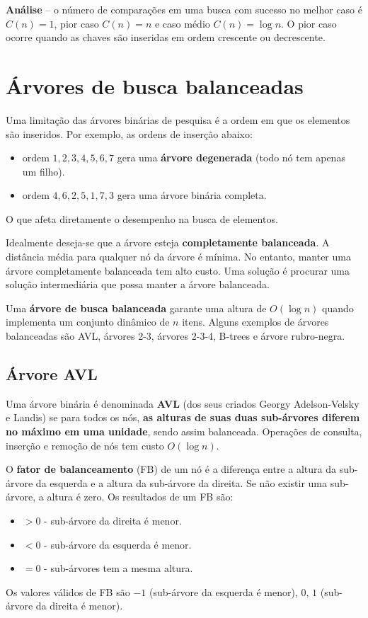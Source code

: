 {\bf Análise} -- o número de comparações em uma busca com sucesso no melhor caso é 
$C(n)= 1$, pior caso $C(n) = n$ e caso médio $C(n) = \log  n$.
O pior caso ocorre quando as chaves são inseridas em ordem crescente ou decrescente.

\section{Árvores de busca balanceadas}

Uma limitação das árvores binárias de pesquisa é a ordem em que os elementos
são inseridos. Por exemplo, as ordens de inserção abaixo:
\begin{itemize}
\item ordem $1, 2, 3, 4, 5, 6, 7$ gera uma {\bf árvore degenerada} (todo nó
tem apenas um filho).
\item ordem $4, 6, 2, 5, 1, 7, 3$ gera uma árvore binária completa.
\end{itemize}
O que afeta diretamente o desempenho na busca de elementos.

Idealmente deseja-se que a árvore esteja {\bf completamente balanceada}.
A distância média para qualquer nó da árvore é mínima.
No entanto, manter uma árvore completamente balanceada tem alto custo.
Uma solução é procurar uma solução intermediária que possa manter a árvore
balanceada.

Uma {\bf árvore de busca balanceada} garante uma altura de $O(\log n)$
quando implementa um conjunto dinâmico de $n$ itens.
Alguns exemplos de árvores balanceadas são AVL, árvores 2-3, árvores 2-3-4,
B-trees e árvore rubro-negra.

\subsection{Árvore AVL}

Uma árvore binária é denominada {\bf AVL} (dos seus criados Georgy
Adelson-Velsky e Landis) se para todos os nós, {\bf as alturas de suas duas
sub-árvores diferem no máximo em uma unidade}, sendo assim balanceada.
Operações de consulta, inserção e remoção de nós tem custo $O(\log n)$.

O {\bf fator de balanceamento} (FB) de um nó é a diferença entre
a altura da sub-árvore da esquerda e a altura da sub-árvore da direita.
Se não existir uma sub-árvore, a altura é zero.
Os resultados de um FB são:
\begin{itemize}
\item $> 0$ - sub-árvore da direita é menor.
\item $< 0$ - sub-árvore da esquerda é menor.
\item $= 0$ - sub-árvores tem a mesma altura.
\end{itemize}
Os valores válidos de FB são $-1$ (sub-árvore da esquerda é menor), $0$, $1$
(sub-árvore da direita é menor).

